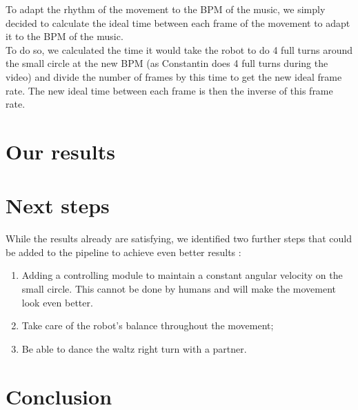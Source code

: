 \documentclass{amsart}
\theoremstyle{definition}
\theoremstyle{plain}
\begin{document}
To adapt the rhythm of the movement to the BPM of the music, we simply decided to calculate the ideal time between each frame of the movement to adapt it to the BPM of the music. \\

To do so, we calculated the time it would take the robot to do 4 full turns around the small circle at the new BPM (as Constantin does 4 full turns during the video) and divide the number of frames by this time to get the new ideal frame rate. The new ideal time between each frame is then the inverse of this frame rate.

\section{Our results}


\section{Next steps}


While the results already are satisfying, we identified two further steps that could be added to the pipeline to achieve even better results :
\begin{enumerate}
    \item Adding a controlling module to maintain a constant angular velocity on the small circle. This cannot be done by humans and will make the movement look even better.
    \item Take care of the robot's balance throughout the movement;
    \item Be able to dance the waltz right turn with a partner.
\end{enumerate}

\section{Conclusion}


\printbibliography[]
\end{document}
